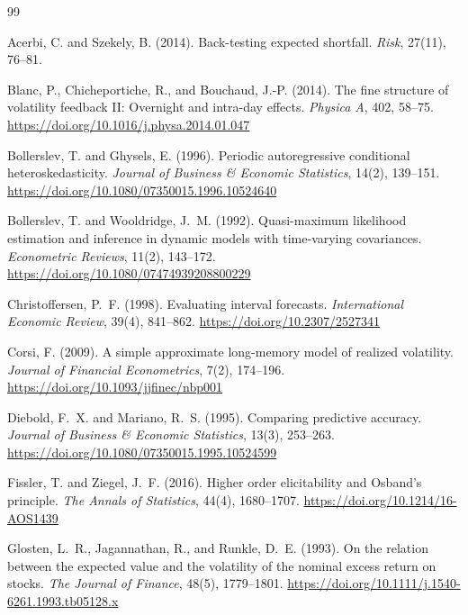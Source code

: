 \documentclass[11pt,a4paper]{article}
\begin{document}
\begin{thebibliography}{99}

Acerbi, C. and Szekely, B. (2014).
\newblock Back-testing expected shortfall.
\newblock \emph{Risk}, 27(11), 76--81.

Blanc, P., Chicheportiche, R., and Bouchaud, J.-P. (2014).
\newblock The fine structure of volatility feedback II: Overnight and intra-day effects.
\newblock \emph{Physica A}, 402, 58--75.
\newblock \url{https://doi.org/10.1016/j.physa.2014.01.047}

Bollerslev, T. and Ghysels, E. (1996).
\newblock Periodic autoregressive conditional heteroskedasticity.
\newblock \emph{Journal of Business \& Economic Statistics}, 14(2), 139--151.
\newblock \url{https://doi.org/10.1080/07350015.1996.10524640}

Bollerslev, T. and Wooldridge, J.~M. (1992).
\newblock Quasi-maximum likelihood estimation and inference in dynamic models with time-varying covariances.
\newblock \emph{Econometric Reviews}, 11(2), 143--172.
\newblock \url{https://doi.org/10.1080/07474939208800229}

Christoffersen, P.~F. (1998).
\newblock Evaluating interval forecasts.
\newblock \emph{International Economic Review}, 39(4), 841--862.
\newblock \url{https://doi.org/10.2307/2527341}

Corsi, F. (2009).
\newblock A simple approximate long-memory model of realized volatility.
\newblock \emph{Journal of Financial Econometrics}, 7(2), 174--196.
\newblock \url{https://doi.org/10.1093/jjfinec/nbp001}

Diebold, F.~X. and Mariano, R.~S. (1995).
\newblock Comparing predictive accuracy.
\newblock \emph{Journal of Business \& Economic Statistics}, 13(3), 253--263.
\newblock \url{https://doi.org/10.1080/07350015.1995.10524599}

Fissler, T. and Ziegel, J.~F. (2016).
\newblock Higher order elicitability and Osband's principle.
\newblock \emph{The Annals of Statistics}, 44(4), 1680--1707.
\newblock \url{https://doi.org/10.1214/16-AOS1439}

Glosten, L.~R., Jagannathan, R., and Runkle, D.~E. (1993).
\newblock On the relation between the expected value and the volatility of the nominal excess return on stocks.
\newblock \emph{The Journal of Finance}, 48(5), 1779--1801.
\newblock \url{https://doi.org/10.1111/j.1540-6261.1993.tb05128.x}


\end{thebibliography}
\end{document}
